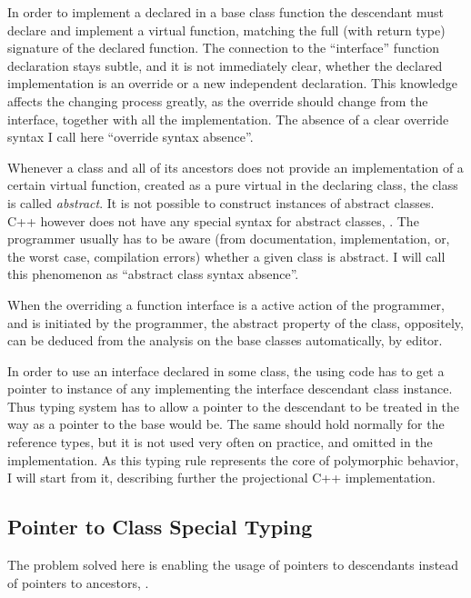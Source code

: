 In order to implement a declared in a base class function the descendant must declare and implement
a virtual function, matching the full (with return type) signature of the declared function. The connection 
to the ``interface'' function declaration stays subtle, and it is not immediately clear, whether the 
declared implementation is an override or a new independent declaration. This knowledge affects the 
changing process greatly, as the override should change from the interface, together with all the implementation.
The absence of a clear override syntax I call here ``override syntax absence''.

Whenever a class and all of its ancestors does not provide an implementation of a certain virtual function,
created as a pure virtual in the declaring class, the class is called \emph{abstract}. It is not possible
to construct instances of abstract classes. C++ however does not have any special syntax for abstract classes,  .
The programmer usually has to be aware (from documentation, implementation, or, the worst case, compilation
errors) whether a given class is abstract. I will call this phenomenon as ``abstract class syntax absence''.

When the overriding a function interface is a active action of the programmer, and is initiated by the 
programmer, the abstract property of the class, oppositely, can be deduced from the analysis on 
the base classes automatically, by editor.

In order to use an interface declared in some class, the using code has to get a pointer to instance
of any implementing the interface descendant class instance. Thus typing system has to allow a pointer
to the descendant to be treated in the way as a pointer to the base would be. The same should hold 
normally for the reference types, but it is not used very often on practice, and omitted in the implementation.
As this typing rule represents the core of polymorphic behavior, I will start from it, describing further the
projectional C++ implementation.

\subsection{Pointer to Class Special Typing}

The problem solved here is enabling the usage of pointers to descendants instead of pointers to ancestors,
.


